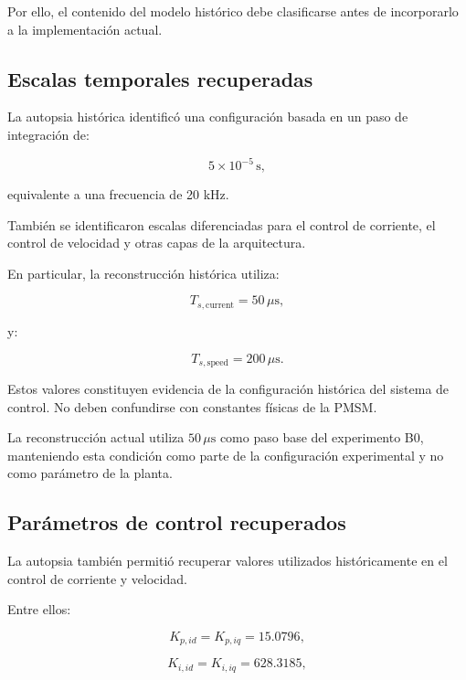 Por ello, el contenido del modelo histórico debe clasificarse antes de incorporarlo a la implementación actual.

\subsection{Escalas temporales recuperadas}

La autopsia histórica identificó una configuración basada en un paso de integración de:

\begin{equation}
5\times10^{-5}\,\mathrm{s},
\end{equation}

equivalente a una frecuencia de 20 kHz.

También se identificaron escalas diferenciadas para el control de corriente, el control de velocidad y otras capas de la arquitectura.

En particular, la reconstrucción histórica utiliza:

\begin{equation}
T_{s,\mathrm{current}}=50\,\mu\mathrm{s},
\end{equation}

y:

\begin{equation}
T_{s,\mathrm{speed}}=200\,\mu\mathrm{s}.
\end{equation}

Estos valores constituyen evidencia de la configuración histórica del sistema de control. No deben confundirse con constantes físicas de la PMSM.

La reconstrucción actual utiliza $50\,\mu\mathrm{s}$ como paso base del experimento B0, manteniendo esta condición como parte de la configuración experimental y no como parámetro de la planta.

\subsection{Parámetros de control recuperados}

La autopsia también permitió recuperar valores utilizados históricamente en el control de corriente y velocidad.

Entre ellos:

\begin{equation}
K_{p,id}=K_{p,iq}=15.0796,
\end{equation}

\begin{equation}
K_{i,id}=K_{i,iq}=628.3185,
\end{equation}


